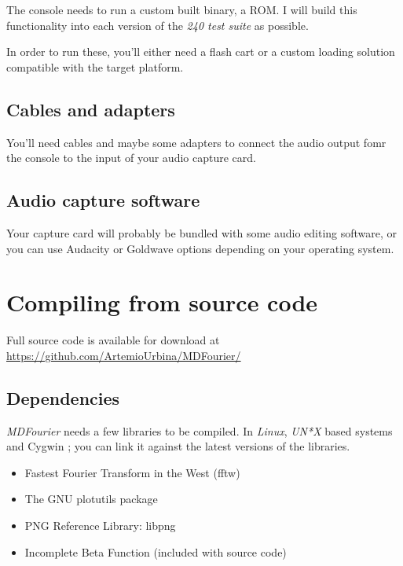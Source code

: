 \documentclass[10pt,a4paper]{report}
\begin{document}
\begin{appendices}
The console needs to run a custom built binary, a ROM. I will build this functionality into each version of the \textit{240 test suite} \cite{240pSuite} as possible.

In order to run these, you'll either need a flash cart or a custom loading solution compatible with the target platform.

\section{Cables and adapters}

You'll need cables and maybe some adapters to connect the audio output fomr the console to the input of your audio capture card.

\section{Audio capture software}

Your capture card will probably be bundled with some audio editing software, or you can use  Audacity \cite{audacity} or Goldwave \cite{goldwave} options depending on your operating system.

\chapter{Compiling from source code}

Full source code is available for download at \url{https://github.com/ArtemioUrbina/MDFourier/}

\section{Dependencies}

\textit{MDFourier} needs a few libraries to be compiled. In \textit{Linux}, \textit{UN*X} based systems and Cygwin \cite{cygwin}; you can link it against the latest versions of the libraries. 

\begin{itemize}
	\item Fastest Fourier Transform in the West (fftw) \cite{fftw}
	\item The GNU plotutils package \cite{libplot}
	\item PNG Reference Library: libpng \cite{libpng}
	\item Incomplete Beta Function \cite{betafunction} (included with source code)
\end{itemize}


\end{appendices}
\end{document}
